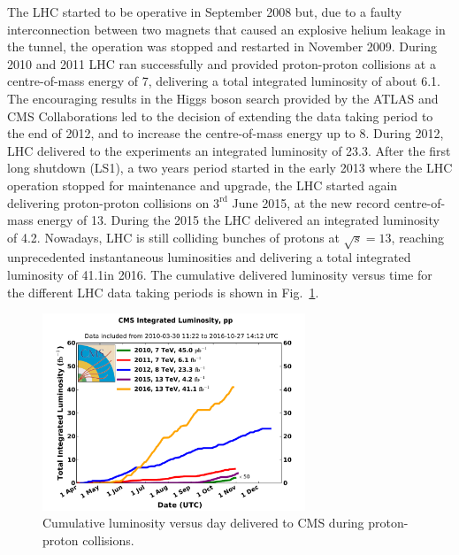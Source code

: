 The LHC started to be operative in September 2008 but, due to a faulty interconnection between two magnets that caused an explosive helium leakage in the tunnel, the operation was stopped and restarted in November 2009. During 2010 and 2011 LHC ran successfully and provided proton-proton collisions at a centre-of-mass energy of 7\TeV, delivering a total integrated luminosity of about 6.1\ifb. The encouraging results in the Higgs boson search provided by the ATLAS and CMS Collaborations led to the decision of extending the data taking period to the end of 2012, and to increase the centre-of-mass energy up to 8\TeV. During 2012, LHC delivered to the experiments an integrated luminosity of 23.3\ifb. After the first long shutdown (LS1), a two years period started in the early 2013 where the LHC operation stopped for maintenance and upgrade, the LHC started again delivering proton-proton collisions on $3^\mathrm{rd}$ June 2015, at the new record centre-of-mass energy of 13\TeV. During the 2015 the LHC delivered an integrated luminosity of 4.2\ifb. Nowadays, LHC is still colliding bunches of protons at $\sqrt{s}=13$\TeV, reaching unprecedented instantaneous luminosities and delivering a total integrated luminosity of 41.1\ifb in 2016. The cumulative delivered luminosity versus time for the different LHC data taking periods is shown in Fig.~\ref{fig:LHClumi}.

\begin{figure}[htb]
\centering
\includegraphics[width=0.7\textwidth]{images/LHClumi.pdf}
\caption{Cumulative luminosity versus day delivered to CMS during proton-proton collisions.}\label{fig:LHClumi}
\end{figure}

